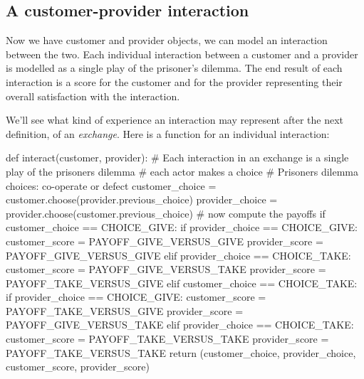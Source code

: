 \documentclass[
  letterpaper,
  DIV=11,
  numbers=noendperiod]{scrartcl}
\newenvironment{Shaded}{\begin{snugshade}}{\end{snugshade}}
\newcommand{\CommentTok}[1]{\textcolor[rgb]{0.37,0.37,0.37}{#1}}
\newcommand{\ControlFlowTok}[1]{\textcolor[rgb]{0.00,0.23,0.31}{#1}}
\newcommand{\KeywordTok}[1]{\textcolor[rgb]{0.00,0.23,0.31}{#1}}
\newcommand{\NormalTok}[1]{\textcolor[rgb]{0.00,0.23,0.31}{#1}}
\newcommand{\OperatorTok}[1]{\textcolor[rgb]{0.37,0.37,0.37}{#1}}
\begin{document}
\hypertarget{a-customer-provider-interaction}{%
\subsection{A customer-provider
interaction}\label{a-customer-provider-interaction}}

Now we have customer and provider objects, we can model an interaction
between the two. Each individual interaction between a customer and a
provider is modelled as a single play of the prisoner's dilemma. The end
result of each interaction is a score for the customer and for the
provider representing their overall satisfaction with the interaction.

We'll see what kind of experience an interaction may represent after the
next definition, of an \emph{exchange}. Here is a function for an
individual interaction:

\begin{Shaded}
\begin{Highlighting}[]
\KeywordTok{def}\NormalTok{ interact(customer, provider):}
    \CommentTok{\# Each interaction in an exchange is a single play of the prisoner\textquotesingle{}s dilemma}
    \CommentTok{\# each actor makes a choice}
    \CommentTok{\# Prisoner\textquotesingle{}s dilemma choices: co{-}operate or defect}
\NormalTok{    customer\_choice }\OperatorTok{=}\NormalTok{ customer.choose(provider.previous\_choice)}
\NormalTok{    provider\_choice }\OperatorTok{=}\NormalTok{ provider.choose(customer.previous\_choice)}
    \CommentTok{\# now compute the payoffs}
    \ControlFlowTok{if}\NormalTok{ customer\_choice }\OperatorTok{==}\NormalTok{ CHOICE\_GIVE:}
        \ControlFlowTok{if}\NormalTok{ provider\_choice }\OperatorTok{==}\NormalTok{ CHOICE\_GIVE:}
\NormalTok{            customer\_score }\OperatorTok{=}\NormalTok{ PAYOFF\_GIVE\_VERSUS\_GIVE}
\NormalTok{            provider\_score }\OperatorTok{=}\NormalTok{ PAYOFF\_GIVE\_VERSUS\_GIVE}
        \ControlFlowTok{elif}\NormalTok{ provider\_choice }\OperatorTok{==}\NormalTok{ CHOICE\_TAKE:}
\NormalTok{            customer\_score }\OperatorTok{=}\NormalTok{ PAYOFF\_GIVE\_VERSUS\_TAKE}
\NormalTok{            provider\_score }\OperatorTok{=}\NormalTok{ PAYOFF\_TAKE\_VERSUS\_GIVE}
    \ControlFlowTok{elif}\NormalTok{ customer\_choice }\OperatorTok{==}\NormalTok{ CHOICE\_TAKE:}
        \ControlFlowTok{if}\NormalTok{ provider\_choice }\OperatorTok{==}\NormalTok{ CHOICE\_GIVE:}
\NormalTok{            customer\_score }\OperatorTok{=}\NormalTok{ PAYOFF\_TAKE\_VERSUS\_GIVE}
\NormalTok{            provider\_score }\OperatorTok{=}\NormalTok{ PAYOFF\_GIVE\_VERSUS\_TAKE}
        \ControlFlowTok{elif}\NormalTok{ provider\_choice }\OperatorTok{==}\NormalTok{ CHOICE\_TAKE:}
\NormalTok{            customer\_score }\OperatorTok{=}\NormalTok{ PAYOFF\_TAKE\_VERSUS\_TAKE}
\NormalTok{            provider\_score }\OperatorTok{=}\NormalTok{ PAYOFF\_TAKE\_VERSUS\_TAKE}
    \ControlFlowTok{return}\NormalTok{ (customer\_choice, provider\_choice, customer\_score, provider\_score)}
\end{Highlighting}
\end{Shaded}
\end{document}
